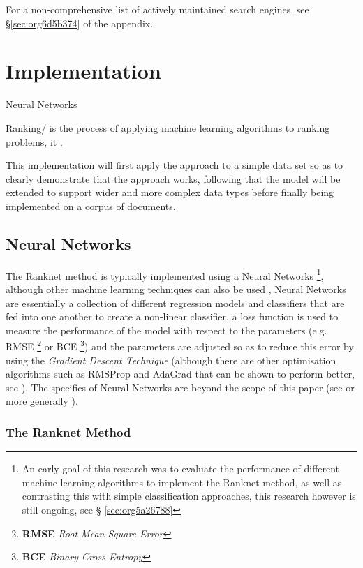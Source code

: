 \documentclass[a4paper,11pt,twoside]{article}
\begin{document}
For a non-comprehensive list of actively maintained search engines,
see \S \ref{sec:org6d5b374} of the appendix.

\section{Implementation}
\label{sec:org66d69cc}



Neural Networks 

Ranking/ is the process of applying machine learning algorithms to
ranking problems, it .

This implementation will first apply the approach to a simple data
set so as to clearly demonstrate that the approach works, following
that the model will be extended to support wider and more complex
data types before finally being implemented on a corpus of documents.

\subsection{Neural Networks}
\label{sec:org12e6074}

The Ranknet method is typically implemented using a Neural Networks
\footnote{An early goal of this research was to evaluate the performance
of different machine learning algorithms to implement the Ranknet
method, as well as contrasting this with simple classification
approaches, this research however is still ongoing,  see \S
\ref{sec:org5a26788}},
although other machine learning techniques can also be used
\cite[p. 1]{christopherburgesRankNetRankingRetrospective2015},
Neural Networks are essentially a collection of different
regression models and classifiers that are fed into one another to create a
non-linear classifier, a loss function is used to measure the
performance of the model with respect to the parameters
(e.g. RMSE \footnote{\textbf{RMSE} \emph{Root Mean Square Error}} or BCE \footnote{\textbf{BCE} \emph{Binary Cross Entropy}}) and the parameters are adjusted so
as to reduce this error by using the \emph{Gradient Descent Technique}
(although there are other optimisation algorithms such as RMSProp
and AdaGrad \cite{mukkamalaVariantsRMSPropAdagrad2017} that can be
shown to perform better, see
\cite{bushaevUnderstandingRMSpropFaster2018}). The specifics of
Neural Networks are beyond the scope of this paper (see
\cite{hmkcodeBackpropagationStepStep} or more generally \cite{pictonNeuralNetworks1994}).

\subsubsection{The Ranknet Method}
\label{sec:orgd67bf5c}
\end{document}
